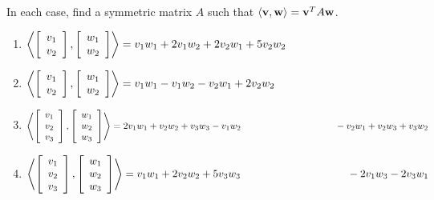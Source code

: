 \begin{multicols}{2}
\begin{ex}
In each case, find a symmetric matrix $A$ such that $\langle\textbf{v}, \textbf{w}\rangle = \textbf{v}^{T}A\textbf{w}$.

{\footnotesize
\begin{enumerate}[label={\alph*.}]
\item 
$  \left\langle
\left[ \begin{array}{r}
v_1 \\
v_2
\end{array} \right], \left[ \begin{array}{r}
w_1 \\
w_2
\end{array} \right]
\right\rangle
= v_1w_1 + 2v_1w_2 + 2v_2w_1 + 5v_2w_2$

\item 
$\left\langle
\left[ \begin{array}{r}
v_1 \\
v_2
\end{array} \right], \left[ \begin{array}{r}
w_1 \\
w_2
\end{array} \right]
\right\rangle
= v_1w_1 - v_1w_2 - v_2w_1 + 2v_2w_2$

\item 
$\left\langle
\leftB \begin{array}{r}
v_1 \\
v_2 \\
v_3
\end{array} \rightB, \leftB \begin{array}{r}
w_1 \\
w_2 \\
w_3
\end{array} \rightB
\right\rangle
= 2v_1w_1 + v_2w_2 + v_3w_3 - v_1w_2 \\ \hspace*{10em}-v_2w_1 + v_2w_3 + v_3w_2$

\item 
$\left\langle
\leftB \begin{array}{r}
v_1 \\
v_2 \\
v_3
\end{array} \rightB, \leftB \begin{array}{r}
w_1 \\
w_2 \\
w_3
\end{array} \rightB
\right\rangle
= v_1w_1 + 2v_2w_2 + 5v_3w_3 \\ \hspace*{10em}- 2v_1w_3 - 2v_3w_1$


\end{enumerate}}
\end{ex}
\end{multicols}

